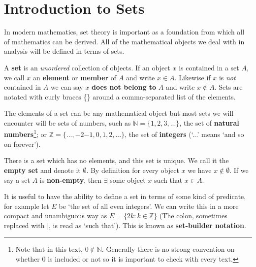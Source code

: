 \documentclass[../real_analysis.tex]{subfiles}
\begin{document}
    \section{Introduction to Sets}\label{sec:introduction-to-sets}
        In modern mathematics, set theory is important as a foundation from which all of mathematics can be derived. All of the mathematical objects we deal with in analysis will be defined in terms of sets.
        \begin{definition}
            A \textbf{set} is an \textit{unordered} collection of objects. If an object $x$ is contained in a set $A$, we call $x$ an \textbf{element} or \textbf{member} of $A$ and write $x \in A$. Likewise if $x$ is \textit{not} contained in $A$ we can say $x$ \textbf{does not belong to} $A$ and write $x \notin A$. Sets are notated with curly braces \{\} around a comma-separated list of the elements.
        \end{definition}
        The elements of a set can be any mathematical object but most sets we will encounter will be sets of numbers, such as $\mathbb{N}=\{1, 2, 3, ...\}$, the set of \textbf{natural numbers}\footnote{Note that in this text, $0 \notin \mathbb{N}$. Generally there is no strong convention on whether 0 is included or not so it is important to check with every text.}; or $\mathbb{Z}=\{..., {-2} {-1}, 0, 1, 2, ...\}$, the set of \textbf{integers} (`...' means `and so on forever').

        \begin{definition}
            There is a set which has no elements, and this set is unique. We call it the \textbf{empty set} and denote it $\emptyset$. By definition for every object $x$ we have $x \notin \emptyset$. If we say a set $A$ is \textbf{non-empty}, then $\exists$ some object $x$ such that $x \in A$.
        \end{definition}

        It is useful to have the ability to define a set in terms of some kind of predicate, for example let $E$ be `the set of all even integers'. We can write this in a more compact and unambiguous way as $E = \{2k : k \in \mathbb{Z}\}$ (The colon, sometimes replaced with $|$, is read as `such that'). This is known as \textbf{set-builder notation}.
\end{document}
